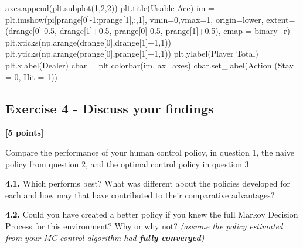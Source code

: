 \documentclass[
  letterpaper,
  DIV=11,
  numbers=noendperiod]{scrartcl}
\newenvironment{Shaded}{\begin{snugshade}}{\end{snugshade}}
\newcommand{\DecValTok}[1]{\textcolor[rgb]{0.68,0.00,0.00}{#1}}
\newcommand{\FloatTok}[1]{\textcolor[rgb]{0.68,0.00,0.00}{#1}}
\newcommand{\NormalTok}[1]{\textcolor[rgb]{0.00,0.23,0.31}{#1}}
\newcommand{\OperatorTok}[1]{\textcolor[rgb]{0.37,0.37,0.37}{#1}}
\newcommand{\StringTok}[1]{\textcolor[rgb]{0.13,0.47,0.30}{#1}}
\begin{document}
\begin{Shaded}
\begin{Highlighting}[]
\NormalTok{    axes.append(plt.subplot(}\DecValTok{1}\NormalTok{,}\DecValTok{2}\NormalTok{,}\DecValTok{2}\NormalTok{))}
\NormalTok{    plt.title(}\StringTok{\textquotesingle{}Usable Ace\textquotesingle{}}\NormalTok{)}
\NormalTok{    im }\OperatorTok{=}\NormalTok{ plt.imshow(pi[prange[}\DecValTok{0}\NormalTok{]}\OperatorTok{{-}}\DecValTok{1}\NormalTok{:prange[}\DecValTok{1}\NormalTok{],:,}\DecValTok{1}\NormalTok{], }
\NormalTok{               vmin}\OperatorTok{=}\DecValTok{0}\NormalTok{,vmax}\OperatorTok{=}\DecValTok{1}\NormalTok{,}
\NormalTok{               origin}\OperatorTok{=}\StringTok{\textquotesingle{}lower\textquotesingle{}}\NormalTok{, }
\NormalTok{               extent}\OperatorTok{=}\NormalTok{(drange[}\DecValTok{0}\NormalTok{]}\OperatorTok{{-}}\FloatTok{0.5}\NormalTok{,}
\NormalTok{                       drange[}\DecValTok{1}\NormalTok{]}\OperatorTok{+}\FloatTok{0.5}\NormalTok{,}
\NormalTok{                       prange[}\DecValTok{0}\NormalTok{]}\OperatorTok{{-}}\FloatTok{0.5}\NormalTok{,}
\NormalTok{                       prange[}\DecValTok{1}\NormalTok{]}\OperatorTok{+}\FloatTok{0.5}\NormalTok{),}
\NormalTok{               cmap }\OperatorTok{=} \StringTok{\textquotesingle{}binary\_r\textquotesingle{}}\NormalTok{)}
\NormalTok{    plt.xticks(np.arange(drange[}\DecValTok{0}\NormalTok{],drange[}\DecValTok{1}\NormalTok{]}\OperatorTok{+}\DecValTok{1}\NormalTok{,}\DecValTok{1}\NormalTok{))}
\NormalTok{    plt.yticks(np.arange(prange[}\DecValTok{0}\NormalTok{],prange[}\DecValTok{1}\NormalTok{]}\OperatorTok{+}\DecValTok{1}\NormalTok{,}\DecValTok{1}\NormalTok{))}
\NormalTok{    plt.ylabel(}\StringTok{\textquotesingle{}Player Total\textquotesingle{}}\NormalTok{)}
\NormalTok{    plt.xlabel(}\StringTok{\textquotesingle{}Dealer\textquotesingle{}}\NormalTok{)}
\NormalTok{    cbar }\OperatorTok{=}\NormalTok{ plt.colorbar(im, ax}\OperatorTok{=}\NormalTok{axes)}
\NormalTok{    cbar.set\_label(}\StringTok{\textquotesingle{}Action (Stay = 0, Hit = 1)\textquotesingle{}}\NormalTok{)}
\end{Highlighting}
\end{Shaded}

\subsection{Exercise 4 - Discuss your
findings}\label{exercise-4---discuss-your-findings}

\textbf{{[}5 points{]}}

Compare the performance of your human control policy, in question 1, the
naive policy from question 2, and the optimal control policy in question
3.

\textbf{4.1.} Which performs best? What was different about the policies
developed for each and how may that have contributed to their
comparative advantages?

\textbf{4.2.} Could you have created a better policy if you knew the
full Markov Decision Process for this environment? Why or why not?
\emph{(assume the policy estimated from your MC control algorithm had
\textbf{fully converged})}
\end{document}
